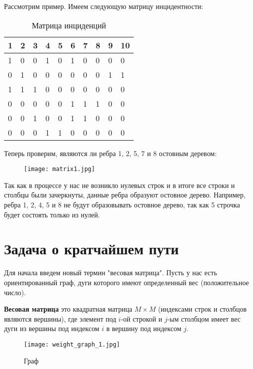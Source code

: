 Рассмотрим пример. Имеем следующую матрицу инцидентности:
\begin{table}[h]
    \centering
    \begin{tabular}[c]{ | l | l | l | l | l | l | l | l | l | l | }
        \hline
        1 & 2 & 3 & 4 & 5 & 6 & 7 & 8 & 9 & 10 \\ \hline
        1 & 0 & 0 & 1 & 0 & 1 & 0 & 0 & 0 & 0 \\ \hline
        0 & 1 & 0 & 0 & 0 & 0 & 0 & 0 & 1 & 1 \\ \hline
        1 & 1 & 1 & 0 & 0 & 0 & 0 & 0 & 0 & 0 \\ \hline
        0 & 0 & 0 & 0 & 0 & 1 & 1 & 1 & 0 & 0 \\ \hline
        0 & 0 & 1 & 0 & 0 & 1 & 1 & 0 & 0 & 0 \\ \hline
        0 & 0 & 0 & 1 & 1 & 0 & 0 & 0 & 0 & 0 \\ 
        \hline
    \end{tabular}
    \caption{Матрица инциденций}
\end{table}

Теперь проверим, являются ли ребра 1, 2, 5, 7 и 8 остовным деревом:
\begin{figure}[!h]
    \centering 
    \texttt{[image: matrix1.jpg]}
\end{figure}

Так как в процессе у нас не возникло нулевых строк и в итоге все строки и столбцы 
были зачеркнуты, данные ребра образуют остовное дерево.
Например, ребра 1, 2, 4, 5 и 8 не будут образовывать остовное дерево, так как 5
строчка будет состоять только из нулей.

\section{Задача о кратчайшем пути}
Для начала введем новый термин "весовая матрица". Пусть у нас есть ориентированный граф,
дуги которого имеют определенный вес (положительное число). 

\textbf{Весовая матрица} это квадратная матрица $M \times M$
(индексами строк и столбцов являются вершины), где элемент под $i$-ой строкой и $j$-ым столбцом имеет вес дуги из вершины
под индексом $i$ в вершину под индексом $j$.
\begin{figure}[!h]
    \centering 
    \texttt{[image: weight\_graph\_1.jpg]}
    \caption{Граф}
    \label{weight_graph}
\end{figure}

